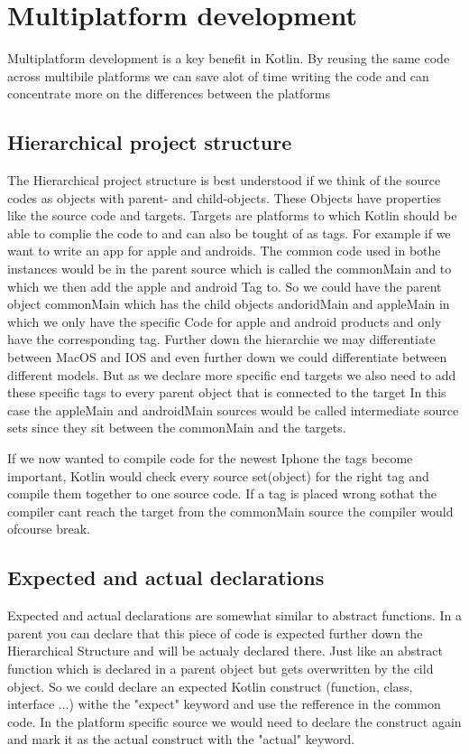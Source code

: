 \documentclass[a4paper,11pt]{article}
\begin{document}
\section{Multiplatform development}
Multiplatform development is a key benefit in Kotlin. By reusing the same code across multibile platforms we can save alot of time writing the code and can concentrate more on the differences between the platforms

\subsection{Hierarchical project structure}
The Hierarchical project structure is best understood if we think of the source codes as objects with parent- and child-objects. These Objects have properties like the source code and targets. Targets are platforms to which Kotlin should be able to complie the code to and can also be tought of as tags. For example if we want to write an app for apple and androids. The common code used in bothe instances would be in the parent source which is called the commonMain and to which we then add the apple and android Tag to.  So we could have the parent object commonMain which has the child objects andoridMain and appleMain in which we only have the specific Code for apple and android products and only have the corresponding tag. Further down the hierarchie we may differentiate between MacOS and IOS and even further down we could differentiate between different models. But as we declare more specific end targets we also need to add these specific tags to every parent object that is connected to the target
In this case the appleMain and androidMain sources would be called intermediate source sets since they sit between the commonMain and the targets.

If we now wanted to compile code for the newest Iphone the tags become important, Kotlin would check every source set(object) for the right tag and compile them together to one source code. If a tag is placed wrong sothat the compiler cant reach the target from the commonMain source the compiler would ofcourse break.

\subsection{Expected and actual declarations}
Expected and actual declarations are somewhat similar to abstract functions. In a parent you can declare that this piece of code is expected further down the Hierarchical Structure and will be actualy declared there. Just like an abstract function which is declared in a parent object but gets overwritten by the cild object.
So we could declare an expected Kotlin construct (function, class, interface ...) withe the "expect" keyword and use the refference in the common code. In the platform specific source we would need to declare the construct again and mark it as the actual construct with the "actual" keyword.
\end{document}
